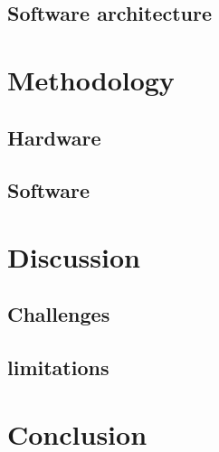 \documentclass[a4paper,twoside]{article}
\begin{document}
\subsection{Software architecture}



\section{Methodology}

\subsection{Hardware}

\subsection{Software}



\section{Discussion}

\subsection{Challenges}

\subsection{limitations}



\section{Conclusion}






% 

 


\end{document}

